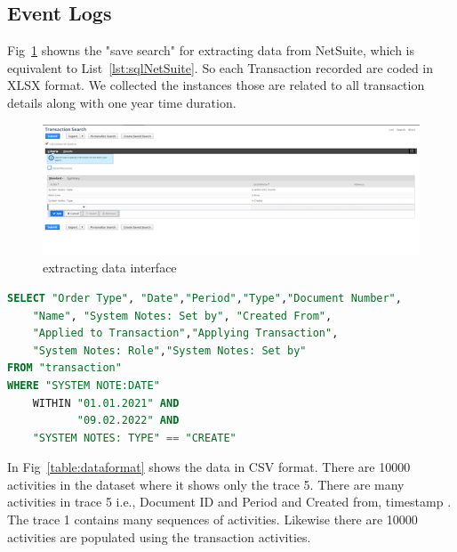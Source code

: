 \subsection{Event Logs}

Fig~\ref{figure:saveSearch} showns the "save search" for extracting data from NetSuite, which is equivalent to List~\ref{lst:sqlNetSuite}. 
So each Transaction recorded are coded in XLSX format. We collected the instances those are related to all transaction details along with one year time duration. 


\begin{figure}[!htb]
    \centering 
    \includegraphics[scale=0.7]{resource/data.png}
    \caption{extracting data interface}
    \label{figure:saveSearch}
\end{figure}



\begin{lstlisting}[language=SQL, caption={equal to SQL}, label={lst:sqlNetSuite} ]
SELECT "Order Type", "Date","Period","Type","Document Number",
    "Name", "System Notes: Set by", "Created From", 
    "Applied to Transaction","Applying Transaction", 
    "System Notes: Role","System Notes: Set by"  
FROM "transaction"
WHERE "SYSTEM NOTE:DATE" 
    WITHIN "01.01.2021" AND 
           "09.02.2022" AND 
    "SYSTEM NOTES: TYPE" == "CREATE"
\end{lstlisting}

In Fig~\ref{table:dataformat} shows the data in CSV format. 
There are 10000 activities in the dataset where it shows only the trace 5. There are many activities in trace 5 i.e., Document ID and Period and Created from, timestamp . The trace 1 contains many sequences of activities. Likewise there are 10000 activities are populated using the transaction activities.

